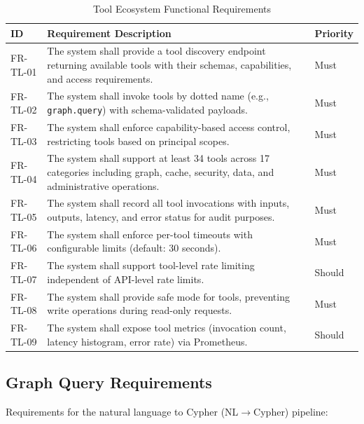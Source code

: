 \begin{table}[htbp]
\centering
\caption{Tool Ecosystem Functional Requirements}
\label{tab:fr-tools}
\small
\begin{tabularx}{\textwidth}{|l|X|l|}
\hline
\textbf{ID} & \textbf{Requirement Description} & \textbf{Priority} \\
\hline
FR-TL-01 & The system shall provide a tool discovery endpoint returning available tools with their schemas, capabilities, and access requirements. & Must \\
\hline
FR-TL-02 & The system shall invoke tools by dotted name (e.g., \texttt{graph.query}) with schema-validated payloads. & Must \\
\hline
FR-TL-03 & The system shall enforce capability-based access control, restricting tools based on principal scopes. & Must \\
\hline
FR-TL-04 & The system shall support at least 34 tools across 17 categories including graph, cache, security, data, and administrative operations. & Must \\
\hline
FR-TL-05 & The system shall record all tool invocations with inputs, outputs, latency, and error status for audit purposes. & Must \\
\hline
FR-TL-06 & The system shall enforce per-tool timeouts with configurable limits (default: 30 seconds). & Must \\
\hline
FR-TL-07 & The system shall support tool-level rate limiting independent of API-level rate limits. & Should \\
\hline
FR-TL-08 & The system shall provide safe mode for tools, preventing write operations during read-only requests. & Must \\
\hline
FR-TL-09 & The system shall expose tool metrics (invocation count, latency histogram, error rate) via Prometheus. & Should \\
\hline
\end{tabularx}
\end{table}

\subsection{Graph Query Requirements}
\label{subsec:fr-graph}

Requirements for the natural language to Cypher (NL$\rightarrow$Cypher) pipeline:

